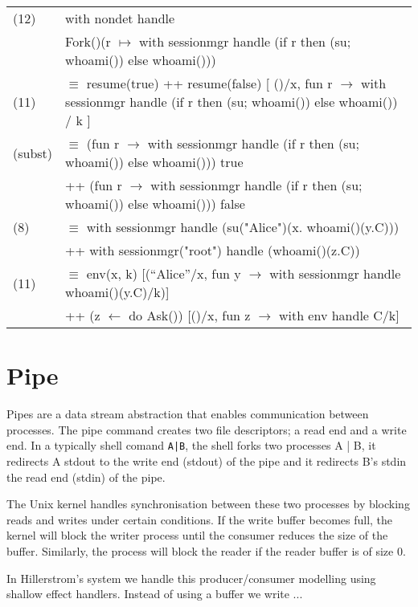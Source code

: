 \documentclass[logo,bsc,singlespacing,parskip]{infthesis}
\begin{document}
\begin{flushleft}
\renewcommand{\arraystretch}{1.3} %
\begin{tabularx}{\textwidth}{l X}
    (12) & with nondet handle \\
         & \quad Fork()(r $\mapsto$ with sessionmgr handle (if r then (su; whoami()) else whoami())) \\
    (11) & $\equiv$ resume(true) ++ resume(false) [ ()/x, fun r $\rightarrow$ with sessionmgr handle (if r then (su; whoami()) else whoami()) / k ] \\
    (subst) & $\equiv$ (fun r $\rightarrow$ with sessionmgr handle (if r then (su; whoami()) else whoami())) true \\
         & \quad ++ (fun r $\rightarrow$ with sessionmgr handle (if r then (su; whoami()) else whoami())) false \\
    (8) & $\equiv$ with sessionmgr handle (su("Alice")(x. whoami()(y.C))) \\
         & \quad ++ with sessionmgr("root") handle (whoami()(z.C)) \\
    (11) & $\equiv$ env(x, k) [(“Alice”/x, fun y $\rightarrow$ with sessionmgr handle whoami()(y.C)/k)] \\
         & \quad ++ (z $\leftarrow$ do Ask()) [()/x, fun z $\rightarrow$ with env handle C/k]
\end{tabularx}
\end{flushleft}


\section{Pipe}
Pipes are a data stream abstraction that enables communication between processes. The pipe command creates two file descriptors; a read end and a write end. In a typically shell comand \texttt{A|B}, the shell forks two processes A | B, it redirects A stdout to the write end (stdout) of the pipe and it redirects B's stdin the read end (stdin) of the pipe. 

The Unix kernel handles synchronisation between these two processes by blocking reads and writes under certain conditions. If the write buffer becomes full, the kernel will block the writer process until the consumer reduces the size of the buffer. Similarly, the process will block the reader if the reader buffer is of size 0.

In Hillerstrom's system we handle this producer/consumer modelling using shallow effect handlers. Instead of using a buffer we write ...
\end{document}
